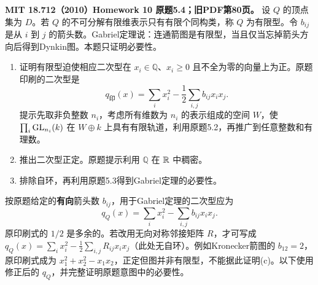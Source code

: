 \begin{exercise}\label{hw:5.4}
\textbf{MIT 18.712（2010）Homework 10 原题5.4；旧PDF第80页。}
设 $Q$ 的顶点集为 $D$。若 $Q$ 的不可分解有限维表示只有有限个同构类，称 $Q$ 为有限型。令 $b_{ij}$ 是从 $i$ 到 $j$ 的箭头数。Gabriel定理说：连通箭图是有限型，当且仅当忘掉箭头方向后得到Dynkin图。本题只证明必要性。
\begin{enumerate}[label=(\alph*)]
\item 证明有限型迫使相应二次型在 $x_i\in\mathbb Q$、$x_i\ge0$ 且不全为零的向量上为正。原题印刷的二次型是
\[
 q_{\text{印}}(x)=\sum_i x_i^2-\frac12\sum_{i,j}b_{ij}x_ix_j.
\]
提示先取非负整数 $n_i$，考虑所有维数为 $n_i$ 的表示组成的空间 $W$，使 $\prod_i\operatorname{GL}_{n_i}(k)$ 在 $W\oplus k$ 上具有有限轨道，利用原题5.2，再推广到任意整数和有理数。
\item 推出二次型正定。原题提示利用 $\mathbb Q$ 在 $\mathbb R$ 中稠密。
\item 排除自环，再利用原题5.3得到Gabriel定理的必要性。
\end{enumerate}
\end{exercise}
\begin{remark}
按原题给定的\textbf{有向}箭头数 $b_{ij}$，用于Gabriel定理的二次型应为
\[
 q_Q(x)=\sum_i x_i^2-\sum_{i,j}b_{ij}x_ix_j.
\]
原印刷式的 $1/2$ 是多余的。若改用无向对称邻接矩阵 $R$，才可写成 $q_Q(x)=\sum_i x_i^2-\tfrac12\sum_{i,j}R_{ij}x_ix_j$（此处无自环）。例如Kronecker箭图的 $b_{12}=2$，原印刷式成为 $x_1^2+x_2^2-x_1x_2$，正定但图并非有限型，不能据此证明(c)。以下使用修正后的 $q_Q$，并完整证明原题意图中的必要性。
\end{remark}
